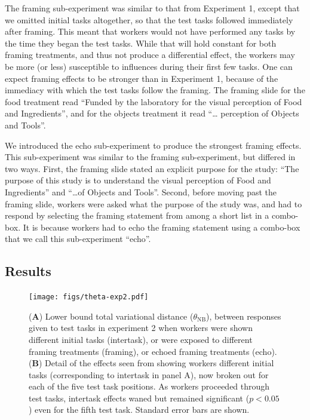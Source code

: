 \documentclass{sigchi}
\begin{document}
The framing sub-experiment was similar to that from Experiment 1, except
that we omitted initial tasks altogether, so that the test tasks followed
immediately after framing.  This meant that workers would not have 
performed any tasks by the time they began the test tasks.  While that will
hold constant for both framing treatments, and thus not produce a 
differential effect, the workers may be more (or less) susceptible to 
influences during their first few tasks.  One can expect framing effects
to be stronger than in Experiment 1, because of the immediacy with which
the test tasks follow the framing.  The framing slide for the food 
treatment read ``Funded by the laboratory for the visual perception of 
Food and Ingredients'', and for the objects treatment it read ``\ldots
perception of Objects and Tools''.

We introduced the echo sub-experiment to produce the strongest framing 
effects.  This sub-experiment was similar to the framing sub-experiment,
but differed in two ways.  First, the framing slide stated an explicit
purpose for the study: ``The purpose of this study is to understand the 
visual perception of Food and Ingredients'' 
and ``\ldots of Objects and Tools''.  Second, before moving past the
framing slide, workers were asked what the purpose of the study was, and
had to respond by selecting the framing statement from among a short
list in a combo-box.  It is because workers had to echo the framing 
statement using a combo-box that we call this sub-experiment ``echo''.

\subsection{Results}

\begin{figure}[t]
    \centering
	\texttt{[image: figs/theta-exp2.pdf]}
	\caption{
	    (\textbf{A}) Lower bound total variational distance 
		($\theta_\mathrm{NB}$), between 
		responses given to test tasks in experiment 2 
		when workers were shown different initial tasks (intertask), 
		or were exposed to different framing treatments (framing), or 
		echoed framing treatments (echo).
		(\textbf{B}) Detail of the effects seen from showing
		workers different initial tasks (corresponding to intertask in 
		panel A), now broken out for each of the five test task positions.
		As workers proceeded through test tasks, intertask effects waned
		but remained significant ($p<0.05$) even for the fifth test task.
		Standard error bars are shown.
	}
	\label{fig:theta}
\end{figure}
\end{document}
